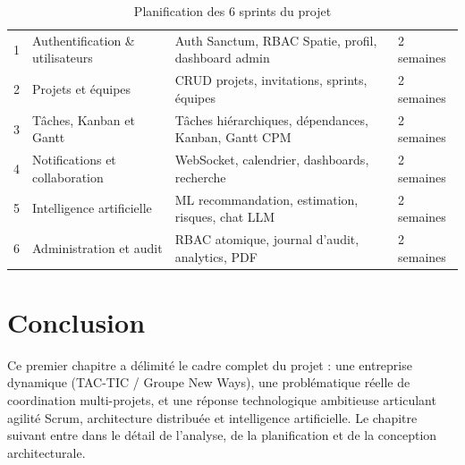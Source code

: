 \begin{table}[H]
  \centering
  \caption{Planification des 6 sprints du projet}
  \label{tab:sprints_planning}
  \begin{tabularx}{\textwidth}{C{1.5cm}L{5cm}X C{2.5cm}}
    \toprule
     &  &  &  \\
    \midrule
    1 & Authentification \& utilisateurs  & Auth Sanctum, RBAC Spatie, profil, dashboard admin & 2 semaines \\
    2 & Projets et équipes               & CRUD projets, invitations, sprints, équipes         & 2 semaines \\
    3 & Tâches, Kanban et Gantt          & Tâches hiérarchiques, dépendances, Kanban, Gantt CPM & 2 semaines \\
    4 & Notifications et collaboration   & WebSocket, calendrier, dashboards, recherche         & 2 semaines \\
    5 & Intelligence artificielle        & ML recommandation, estimation, risques, chat LLM     & 2 semaines \\
    6 & Administration et audit          & RBAC atomique, journal d'audit, analytics, PDF       & 2 semaines \\
    \bottomrule
  \end{tabularx}
\end{table}

\section{Conclusion}

Ce premier chapitre a délimité le cadre complet du projet : une entreprise
dynamique (TAC-TIC / Groupe New Ways), une problématique réelle de coordination
multi-projets, et une réponse technologique ambitieuse articulant agilité Scrum,
architecture distribuée et intelligence artificielle. Le chapitre suivant entre
dans le détail de l'analyse, de la planification et de la conception architecturale.

